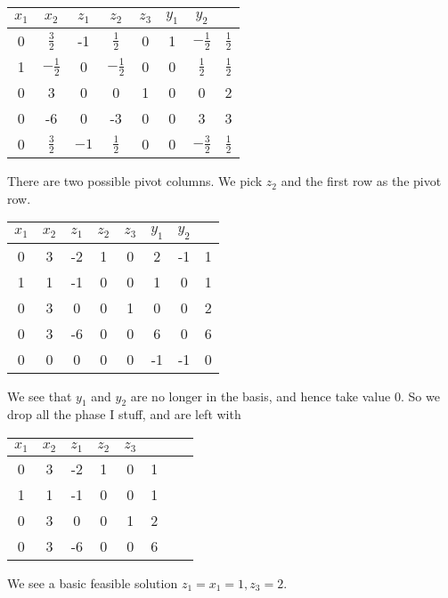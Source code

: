 \documentclass[a4paper]{article}
\begin{document}
\begin{eg}
  \begin{center}
    \begin{tabular}{cccccccc}
      \toprule
      $x_1$ & $x_2$ & $z_1$ & $z_2$ & $z_3$ & $y_1$ & $y_2$ \\
      \midrule
      0 & $\frac{3}{2}$ & -1 & $\frac{1}{2}$ & 0 & 1 & $-\frac{1}{2}$ & $\frac{1}{2}$\\
      1 & $-\frac{1}{2}$ & 0 & $-\frac{1}{2}$ & 0 & 0 & $\frac{1}{2}$ & $\frac{1}{2}$\\
      0 & 3 & 0 & 0 & 1 & 0 & 0 & 2\\
      \midrule
      0 & -6 & 0 & -3 & 0 & 0 & 3 & 3\\
      0 & $\frac{3}{2}$ & $-1$ & $\frac{1}{2}$ & 0 & 0 & $-\frac{3}{2}$ & $\frac{1}{2}$\\
      \bottomrule
    \end{tabular}
  \end{center}
  There are two possible pivot columns. We pick $z_2$ and the first row as the pivot row.
  \begin{center}
    \begin{tabular}{cccccccc}
      \toprule
      $x_1$ & $x_2$ & $z_1$ & $z_2$ & $z_3$ & $y_1$ & $y_2$ \\
      \midrule
      0 & 3 & -2 & 1 & 0 & 2 & -1 & 1\\
      1 & 1 & -1 & 0 & 0 & 1 & 0 & 1\\
      0 & 3 & 0 & 0 & 1 & 0 & 0 & 2\\
      \midrule
      0 & 3 & -6 & 0 & 0 & 6 & 0 & 6\\
      0 & 0 & 0 & 0 & 0 & -1 & -1 & 0\\
      \bottomrule
    \end{tabular}
  \end{center}
  We see that $y_1$ and $y_2$ are no longer in the basis, and hence take value $0$. So we drop all the phase I stuff, and are left with
  \begin{center}
    \begin{tabular}{cccccccc}
      \toprule
      $x_1$ & $x_2$ & $z_1$ & $z_2$ & $z_3$\\
      \midrule
      0 & 3 & -2 & 1 & 0 & 1\\
      1 & 1 & -1 & 0 & 0 & 1\\
      0 & 3 & 0 & 0 & 1 & 2\\
      \midrule
      0 & 3 & -6 & 0 & 0 & 6\\
      \bottomrule
    \end{tabular}
  \end{center}
  We see a basic feasible solution $z_1 = x_1 = 1, z_3 = 2$.


\end{eg}
\end{document}
